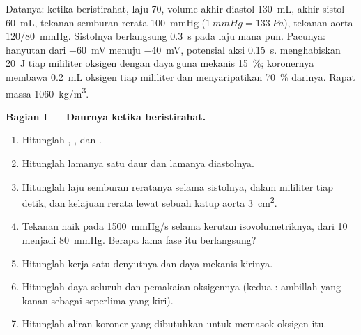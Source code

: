 \begin{problem}
\label{pb:b2:heart:1}
Datanya: ketika beristirahat, laju 70, volume akhir diastol
\qty{130}{mL}, akhir sistol \qty{60}{mL}, tekanan semburan rerata
\qty{100}{mmHg} ($\qty{1}{mmHg} = \qty{133}{Pa}$), tekanan aorta
$120/80$~mmHg. Sistolnya berlangsung \qty{0.3}{s} pada laju mana pun.
Pacunya: hanyutan dari \qty{-60}{mV} menuju \qty{-40}{mV}, potensial
aksi \qty{0.15}{s}.  menghabiskan \qty{20}{J} tiap mililiter
oksigen dengan daya guna mekanis \qty{15}{\%};  koronernya membawa
\qty{0.2}{mL} oksigen tiap mililiter dan  menyaripatikan
\qty{70}{\%} darinya. Rapat massa  \qty{1060}{kg/m^3}.

\medskip
\noindent\textbf{Bagian I --- Daurnya ketika beristirahat.}
\begin{enumerate}
  \item Hitunglah , , dan .
  \item Hitunglah lamanya satu daur dan lamanya diastolnya.
  \item Hitunglah laju semburan reratanya selama sistolnya, dalam
        mililiter tiap detik, dan kelajuan rerata lewat sebuah katup
        aorta \qty{3}{cm^2}.
  \item Tekanan  naik pada \qty{1500}{mmHg/s} selama kerutan
        isovolumetriknya, dari 10 menjadi \qty{80}{mmHg}. Berapa lama
        fase itu berlangsung?
  \item Hitunglah kerja satu denyutnya dan daya mekanis  kirinya.
  \item Hitunglah daya seluruh  dan pemakaian oksigennya
        (kedua : ambillah yang kanan sebagai seperlima yang
        kiri).
  \item Hitunglah aliran  koroner yang dibutuhkan untuk memasok
        oksigen itu.
\end{enumerate}


\end{problem}
